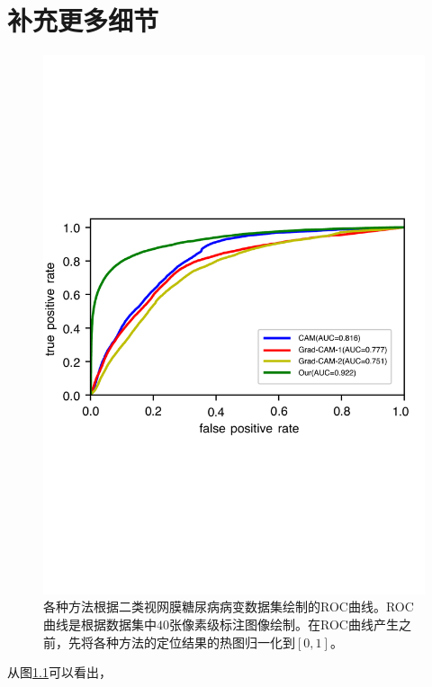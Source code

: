 \chapter{补充更多细节}\label{chapter:append1}
\begin{figure}[h]
	\centering
	\includegraphics[width=1.0\textwidth]{figure/ROC_cam_grad_cam_our_diabetic_retinopathy}
	\caption{各种方法根据二类视网膜糖尿病病变数据集绘制的ROC曲线。ROC曲线是根据数据集中$40$张像素级标注图像绘制。在ROC曲线产生之前，先将各种方法的定位结果的热图归一化到$[0, 1]$。} 
	\label{fig:roc_cam_grad_cam_our_diabetic_retinopathy}
\end{figure}

从图\ref{fig:roc_cam_grad_cam_our_diabetic_retinopathy}可以看出，



